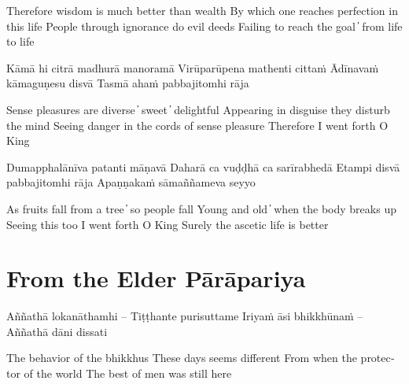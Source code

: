 \begin{english}
Therefore wisdom is much better than wealth
By which one reaches perfection in this life
People through ignorance do evil deeds
Failing to reach the goal  ̓  from life to life
\end{english}

\begin{twochants}
Kāmā hi citrā madhurā manoramā
Virūparūpena mathenti cittaṁ
Ādīnavaṁ kāmaguṇesu disvā
Tasmā ahaṁ pabbajitomhi rāja
\end{twochants}

\begin{english}
Sense pleasures are diverse  ̓  sweet  ̓  delightful
Appearing in disguise they disturb the mind
Seeing danger in the cords of sense pleasure
Therefore I went forth O King
\end{english}

\begin{twochants}
Dumapphalānīva patanti māṇavā
Daharā ca vuḍḍhā ca sarīrabhedā
Etampi disvā pabbajitomhi rāja
Apaṇṇakaṁ sāmaññameva seyyo
\end{twochants}

\begin{english}
As fruits fall from a tree  ̓  so people fall
Young and old  ̓  when the body breaks up
Seeing this too I went forth O King
Surely the ascetic life is better
\end{english}


\clearpage

\section{From the Elder Pārāpariya}

\begin{leader}
\end{leader}

\begin{twochants}
Aññathā lokanāthamhi – Tiṭṭhante purisuttame
Iriyaṁ āsi bhikkhūnaṁ – Aññathā dāni dissati
\end{twochants}

\begin{english}
The behavior of the bhikkhus
These days seems different
From when the protector of the world
The best of men was still here
\end{english}


